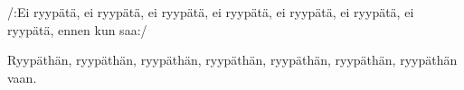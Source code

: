 	
\beginverse*						
/:Ei ryypätä, ei ryypätä, ei ryypätä, ei ryypätä,
ei ryypätä, ei ryypätä, ei ryypätä, 
ennen kun saa:/
\endverse						

\beginverse				
Ryypäthän, ryypäthän, ryypäthän, ryypäthän,
ryypäthän, ryypäthän, 
ryypäthän vaan.
\endverse		
\endsong		
